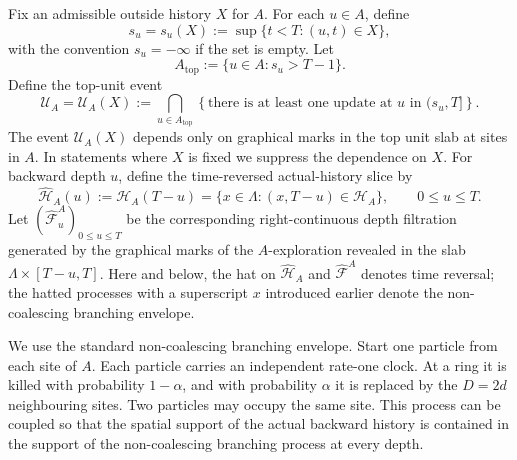 \documentclass[letterpaper,11pt,reqno]{amsart}
\theoremstyle{definition}
\begin{document}
Fix an admissible outside history \(X\) for \(A\).  For each \(u\in A\), define
\[
        s_u=s_u(X):=
        \sup\{t<T:(u,t)\in X\},
\]
with the convention \(s_u=-\infty\) if the set is empty. Let
\[
        A_{\mathrm{top}}
        :=
        \{u\in A:s_u>T-1\}.
\]
Define the top-unit event
\begin{equation}\label{eq:top-unit-U}
\mathcal U_A=\mathcal U_A(X)
        :=
        \bigcap_{u\in A_{\mathrm{top}}}
        \left\{
        \text{there is at least one update at }u
        \text{ in }(s_u,T]
        \right\}.
\end{equation}
The event \(\mathcal U_A(X)\) depends only on graphical marks in the top unit
slab at sites in \(A\).  In statements where \(X\) is fixed we suppress the
dependence on \(X\).
For backward depth \(u\), define the time-reversed actual-history slice by
\[
        \widehat{\mathcal H}_A(u)
        :=
        \mathcal H_A(T-u)
        =\{x\in\Lambda:(x,T-u)\in\mathcal H_A\},
        \qquad 0\le u\le T.
\]
Let \((\widehat{\mathscr F}_u^A)_{0\le u\le T}\) be the corresponding
right-continuous depth filtration
generated by the graphical marks of the \(A\)-exploration revealed in the slab
\(\Lambda\times[T-u,T]\).
Here and below, the hat on \(\widehat{\mathcal H}_A\) and
\(\widehat{\mathscr F}^A\) denotes time reversal; the hatted processes with a
superscript \(x\) introduced earlier denote the non-coalescing branching
envelope.



We use the standard non-coalescing branching envelope. Start one particle from each site of \(A\). Each particle carries an independent rate-one clock. At a ring it is killed with probability \(1-\alpha\), and with probability \(\alpha\) it is replaced by the \(D=2d\) neighbouring sites. Two particles may occupy the same site. This process can be coupled so that
the spatial support of the actual backward history is contained in the support of the non-coalescing branching process at every depth.
\end{document}
